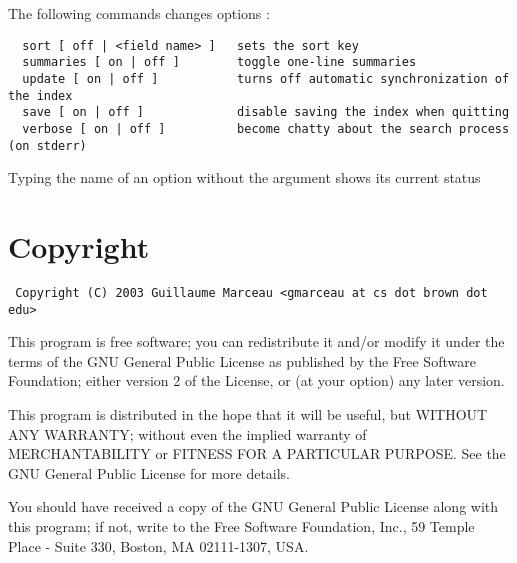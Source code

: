 \documentclass[11pt]{article}
\begin{document}
The following commands changes options :

\linespread{1}
\begin{verbatim}
  sort [ off | <field name> ]   sets the sort key
  summaries [ on | off ]        toggle one-line summaries
  update [ on | off ]           turns off automatic synchronization of the index
  save [ on | off ]             disable saving the index when quitting
  verbose [ on | off ]          become chatty about the search process (on stderr)
\end{verbatim}
\linespread{1.2}
Typing the name of an option without the argument shows its
current status

\section*{Copyright}

\scriptsize
{\tt
Copyright (C) 2003 Guillaume Marceau <gmarceau at cs dot brown dot edu>

This program is free software; you can redistribute it and/or
modify it under the terms of the GNU General Public License
as published by the Free Software Foundation; either version 2
of the License, or (at your option) any later version.

This program is distributed in the hope that it will be useful,
but WITHOUT ANY WARRANTY; without even the implied warranty of
MERCHANTABILITY or FITNESS FOR A PARTICULAR PURPOSE.  See the
GNU General Public License for more details.

You should have received a copy of the GNU General Public License
along with this program; if not, write to the Free Software
Foundation, Inc., 59 Temple Place - Suite 330, Boston, MA  02111-1307, USA.
}
\normalsize
\end{document}
